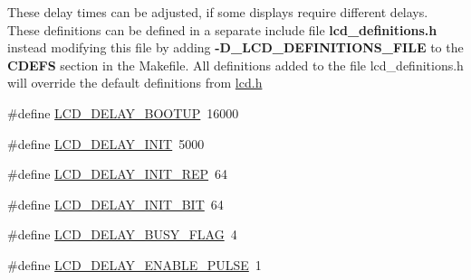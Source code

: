 These delay times can be adjusted, if some displays require different delays.~\newline
 These definitions can be defined in a separate include file {\bfseries{lcd\+\_\+definitions.\+h}} instead modifying this file by adding {\bfseries{-\/D\+\_\+\+L\+C\+D\+\_\+\+D\+E\+F\+I\+N\+I\+T\+I\+O\+N\+S\+\_\+\+F\+I\+LE}} to the {\bfseries{C\+D\+E\+FS}} section in the Makefile. All definitions added to the file lcd\+\_\+definitions.\+h will override the default definitions from \mbox{\hyperlink{lcd_8h}{lcd.\+h}} \begin{DoxyCompactItemize}
\item 
\#define \mbox{\hyperlink{group__pfleury__lcd_ga79ca3fe83448ab158a4c566bf292c260}{L\+C\+D\+\_\+\+D\+E\+L\+A\+Y\+\_\+\+B\+O\+O\+T\+UP}}~16000
\item 
\#define \mbox{\hyperlink{group__pfleury__lcd_gab6ba3c8cdcf1a96b0d4c476eff8f8617}{L\+C\+D\+\_\+\+D\+E\+L\+A\+Y\+\_\+\+I\+N\+IT}}~5000
\item 
\#define \mbox{\hyperlink{group__pfleury__lcd_ga2ce1ac9b146b7baa7169e27f9cf3a99e}{L\+C\+D\+\_\+\+D\+E\+L\+A\+Y\+\_\+\+I\+N\+I\+T\+\_\+\+R\+EP}}~64
\item 
\#define \mbox{\hyperlink{group__pfleury__lcd_gadf773dcbd0827cd15c788065c9197459}{L\+C\+D\+\_\+\+D\+E\+L\+A\+Y\+\_\+\+I\+N\+I\+T\+\_\+B\+IT}}~64
\item 
\#define \mbox{\hyperlink{group__pfleury__lcd_ga73b2370827e2d350cedd45e08a9eb0b2}{L\+C\+D\+\_\+\+D\+E\+L\+A\+Y\+\_\+\+B\+U\+S\+Y\+\_\+\+F\+L\+AG}}~4
\item 
\#define \mbox{\hyperlink{group__pfleury__lcd_ga5b0632f09757ffe6f018c6ef88cc3296}{L\+C\+D\+\_\+\+D\+E\+L\+A\+Y\+\_\+\+E\+N\+A\+B\+L\+E\+\_\+\+P\+U\+L\+SE}}~1
\end{DoxyCompactItemize}
